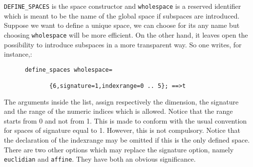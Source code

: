 \texttt{DEFINE\_SPACES} is the space constructor and 
\texttt{wholespace}
is a reserved identifier which is meant to be the name of the global space 
if subspaces are introduced.   
Suppose we want to define a unique space, we can choose for its any name but 
choosing \texttt{wholespace} will be more efficient. On the other hand, it leaves 
open the possibility to introduce subspaces in a more transparent way.
So one writes, for instance,:
\begin{verbatim}
      define_spaces wholespace=
        
             {6,signature=1,indexrange=0 .. 5}; ==>t
\end{verbatim} 
The arguments inside the list, assign respectively the dimension, the signature
and the range of the numeric indices which is allowed. 
Notice that the range starts from 0 and not from 1. This is made to conform with 
the usual convention for spaces of signature equal to 1. However, this is not 
compulsory.
Notice that the declaration of the indexrange may be omitted if this is the 
only  defined space.  
There are two other options which may replace the signature option, namely
\texttt{euclidian} and \texttt{affine}. They 
have both an obvious significance. 

